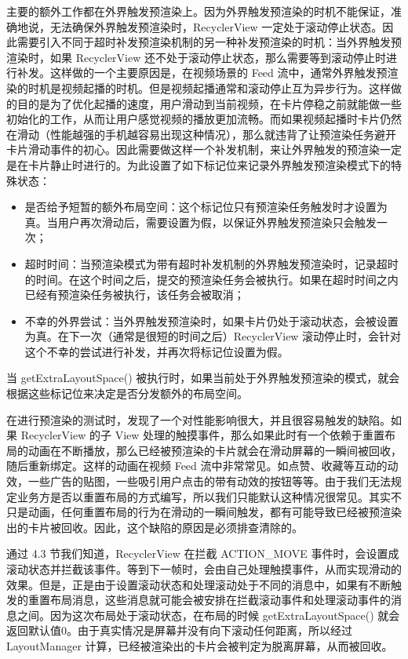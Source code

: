 主要的额外工作都在外界触发预渲染上。因为外界触发预渲染的时机不能保证，准确地说，无法确保外界触发预渲染时，RecyclerView 一定处于滚动停止状态。因此需要引入不同于超时补发预渲染机制的另一种补发预渲染的时机：当外界触发预渲染时，如果 RecyclerView 还不处于滚动停止状态，那么需要等到滚动停止时进行补发。这样做的一个主要原因是，在视频场景的 Feed 流中，通常外界触发预渲染的时机是视频起播的时机。但是视频起播通常和滚动停止互为异步行为。这样做的目的是为了优化起播的速度，用户滑动到当前视频，在卡片停稳之前就能做一些初始化的工作，从而让用户感觉视频的播放更加流畅。而如果视频起播时卡片仍然在滑动（性能越强的手机越容易出现这种情况），那么就违背了让预渲染任务避开卡片滑动事件的初心。因此需要做这样一个补发机制，来让外界触发的预渲染一定是在卡片静止时进行的。为此设置了如下标记位来记录外界触发预渲染模式下的特殊状态：

\begin{itemize}
    \item 是否给予短暂的额外布局空间：这个标记位只有预渲染任务触发时才设置为真。当用户再次滑动后，需要设置为假，以保证外界触发预渲染只会触发一次；
    \item 超时时间：当预渲染模式为带有超时补发机制的外界触发预渲染时，记录超时的时间。在这个时间之后，提交的预渲染任务会被执行。如果在超时时间之内已经有预渲染任务被执行，该任务会被取消；
    \item 不幸的外界尝试：当外界触发预渲染时，如果卡片仍处于滚动状态，会被设置为真。在下一次（通常是很短的时间之后）RecyclerView 滚动停止时，会针对这个不幸的尝试进行补发，并再次将标记位设置为假。
\end{itemize}

当 getExtraLayoutSpace() 被执行时，如果当前处于外界触发预渲染的模式，就会根据这些标记位来决定是否分发额外的布局空间。

在进行预渲染的测试时，发现了一个对性能影响很大，并且很容易触发的缺陷。如果 RecyclerView 的子 View 处理的触摸事件，那么如果此时有一个依赖于重置布局的动画在不断播放，那么已经被预渲染的卡片就会在滑动屏幕的一瞬间被回收，随后重新绑定。这样的动画在视频 Feed 流中非常常见。如点赞、收藏等互动的动效，一些广告的贴图，一些吸引用户点击的带有动效的按钮等等。由于我们无法规定业务方是否以重置布局的方式编写，所以我们只能默认这种情况很常见。其实不只是动画，任何重置布局的行为在滑动的一瞬间触发，都有可能导致已经被预渲染出的卡片被回收。因此，这个缺陷的原因是必须排查清除的。

通过 4.3 节我们知道，RecyclerView 在拦截 ACTION\_MOVE 事件时，会设置成滚动状态并拦截该事件。等到下一帧时，会由自己处理触摸事件，从而实现滑动的效果。但是，正是由于设置滚动状态和处理滚动处于不同的消息中，如果有不断触发的重置布局消息，这些消息就可能会被安排在拦截滚动事件和处理滚动事件的消息之间。因为这次布局处于滚动状态，在布局的时候 getExtraLayoutSpace() 就会返回默认值0。由于真实情况是屏幕并没有向下滚动任何距离，所以经过 LayoutManager 计算，已经被渲染出的卡片会被判定为脱离屏幕，从而被回收。

